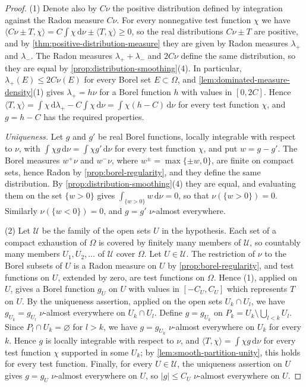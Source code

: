 \begin{proof}
(1) Denote also by $C\nu$ the positive distribution defined by integration against the Radon measure $C\nu$. For every nonnegative test function $\chi$ we have $\langle C\nu\pm T,\chi\rangle=C\int\chi\,\mathrm d\nu\pm\langle T,\chi\rangle\geq0$, so the real distributions $C\nu\pm T$ are positive, and by \cref{thm:positive-distribution-measure} they are given by Radon measures $\lambda_+$ and $\lambda_-$. The Radon measures $\lambda_++\lambda_-$ and $2C\nu$ define the same distribution, so they are equal by \cref{prop:distribution-smoothing}(4). In particular, $\lambda_+(E)\leq2C\nu(E)$ for every Borel set $E\subset\Omega$, and \cref{lem:dominated-measure-density}(1) gives $\lambda_+=h\nu$ for a Borel function $h$ with values in $[0,2C]$. Hence $\langle T,\chi\rangle=\int\chi\,\mathrm d\lambda_+-C\int\chi\,\mathrm d\nu=\int\chi(h-C)\,\mathrm d\nu$ for every test function $\chi$, and $g=h-C$ has the required properties.

\emph{Uniqueness.} Let $g$ and $g'$ be real Borel functions, locally integrable with respect to $\nu$, with $\int\chi g\,\mathrm d\nu=\int\chi g'\,\mathrm d\nu$ for every test function $\chi$, and put $w=g-g'$. The Borel measures $w^+\nu$ and $w^-\nu$, where $w^\pm=\max\{\pm w,0\}$, are finite on compact sets, hence Radon by \cref{prop:borel-regularity}, and they define the same distribution. By \cref{prop:distribution-smoothing}(4) they are equal, and evaluating them on the set $\{w>0\}$ gives $\int_{\{w>0\}}w\,\mathrm d\nu=0$, so that $\nu(\{w>0\})=0$. Similarly $\nu(\{w<0\})=0$, and $g=g'$ $\nu$-almost everywhere.

(2) Let $\mathcal U$ be the family of the open sets $U$ in the hypothesis. Each set of a compact exhaustion of $\Omega$ is covered by finitely many members of $\mathcal U$, so countably many members $U_1,U_2,\ldots$ of $\mathcal U$ cover $\Omega$. Let $U\in\mathcal U$. The restriction of $\nu$ to the Borel subsets of $U$ is a Radon measure on $U$ by \cref{prop:borel-regularity}, and test functions on $U$, extended by zero, are test functions on $\Omega$. Hence (1), applied on $U$, gives a Borel function $g_U$ on $U$ with values in $[-C_U,C_U]$ which represents $T$ on $U$. By the uniqueness assertion, applied on the open sets $U_k\cap U_l$, we have $g_{U_k}=g_{U_l}$ $\nu$-almost everywhere on $U_k\cap U_l$. Define $g=g_{U_k}$ on $P_k=U_k\setminus\bigcup_{l<k}U_l$. Since $P_l\cap U_k=\varnothing$ for $l>k$, we have $g=g_{U_k}$ $\nu$-almost everywhere on $U_k$ for every $k$. Hence $g$ is locally integrable with respect to $\nu$, and $\langle T,\chi\rangle=\int\chi g\,\mathrm d\nu$ for every test function $\chi$ supported in some $U_k$; by \cref{lem:smooth-partition-unity}, this holds for every test function. Finally, for every $U\in\mathcal U$, the uniqueness assertion on $U$ gives $g=g_U$ $\nu$-almost everywhere on $U$, so $|g|\leq C_U$ $\nu$-almost everywhere on $U$.
\end{proof}

